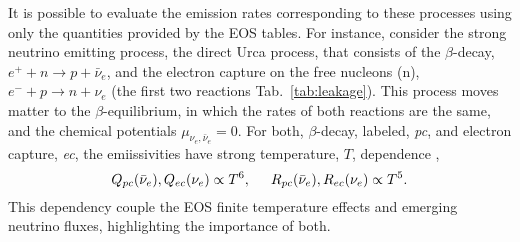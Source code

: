 It is possible to evaluate the emission rates corresponding to these processes 
using only the quantities provided by the \ac{EOS} tables.
%
For instance, consider the strong neutrino emitting process, the direct Urca process, 
that consists of the $\beta$-decay, $e^+ + n \rightarrow p + \bar{\nu}_e$, 
and the electron capture on the free nucleons (n), $e^{-} + p \rightarrow n + \nu_e$ 
(the first two reactions Tab.~\ref{tab:leakage}). 
This process moves matter to the $\beta$-equilibrium, in which the rates 
of both reactions are the same, and the chemical potentials $\mu_{\nu_e,\bar{\nu}_e}=0$.
%
For both, $\beta$-decay, labeled, \textit{pc}, and electron capture, \textit{ec}, 
the emiissivities 
have strong temperature, $T$, dependence \citep{Galeazzi:2013mia}, 
%
\begin{equation}
Q_{pc}(\bar{\nu}_e), Q_{ec}(\nu_e) \propto T^6, \hspace{5mm} R_{pc}(\bar{\nu}_e),R_{ec}(\nu_e)\propto T^5. \\
\end{equation}
%
This dependency couple the \ac{EOS} finite temperature effects and emerging neutrino fluxes,
highlighting the importance of both.
%
%



